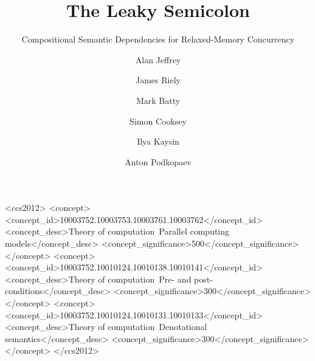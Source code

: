 \documentclass[acmsmall,screen]{acmart}\settopmatter{printfolios=true}
\theoremstyle{acmdefinition}
\begin{document}
\title{The Leaky Semicolon}
\subtitle{Compositional Semantic Dependencies for Relaxed-Memory Concurrency}
\author{Alan Jeffrey}

\author{James Riely}

\author{Mark Batty}

\author{Simon Cooksey}
\orcid{}

\author{Ilya Kaysin}
\orcid{}

\author{Anton Podkopaev}
\orcid{}

\begin{abstract}

\end{abstract}

\begin{CCSXML}
<ccs2012>
   <concept>
       <concept_id>10003752.10003753.10003761.10003762</concept_id>
       <concept_desc>Theory of computation~Parallel computing models</concept_desc>
       <concept_significance>500</concept_significance>
       </concept>
   <concept>
       <concept_id>10003752.10010124.10010138.10010141</concept_id>
       <concept_desc>Theory of computation~Pre- and post-conditions</concept_desc>
       <concept_significance>300</concept_significance>
       </concept>
   <concept>
       <concept_id>10003752.10010124.10010131.10010133</concept_id>
       <concept_desc>Theory of computation~Denotational semantics</concept_desc>
       <concept_significance>300</concept_significance>
       </concept>
 </ccs2012>
\end{CCSXML}
\end{document}
